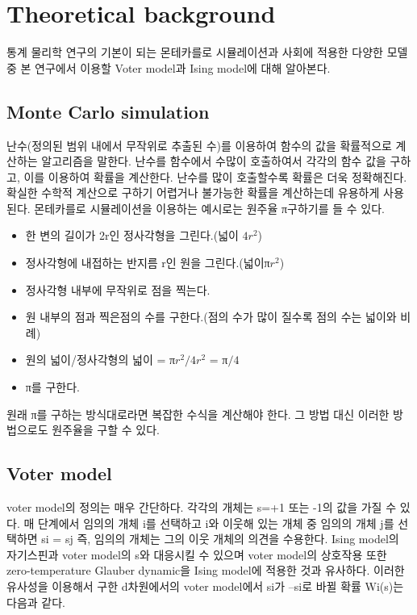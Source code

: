 \documentclass{gshs-report-v1.2}
\begin{document}
\section{Theoretical background}
통계 물리학 연구의 기본이 되는 몬테카를로 시뮬레이션과 사회에 적용한 다양한 모델 중 본 연구에서 이용할 Voter model과 Ising model에 대해 알아본다.

\subsection{Monte Carlo simulation}

난수(정의된 범위 내에서 무작위로 추출된 수)를 이용하여 함수의 값을 확률적으로 계산하는 알고리즘을 말한다. 난수를 함수에서 수많이 호출하여서 각각의 함수 값을 구하고, 이를 이용하여 확률을 계산한다. 난수를 많이 호출할수록 확률은 더욱 정확해진다. 확실한 수학적 계산으로 구하기 어렵거나 불가능한 확률을 계산하는데 유용하게 사용된다. 
몬테카를로 시뮬레이션을 이용하는 예시로는 원주율 π구하기를 들 수 있다. 

\begin{itemize}
	\item{한 변의 길이가 2r인 정사각형을 그린다.(넓이 $4r^2$)}
	\item{정사각형에 내접하는 반지름 r인 원을 그린다.(넓이π$r^2$)}
	\item{정사각형 내부에 무작위로 점을 찍는다. }
	\item{원 내부의 점과 찍은점의 수를 구한다.(점의 수가 많이 질수록 점의 수는 넓이와 비례)}
	\item{원의 넓이/정사각형의 넓이 = π$r^2/4r^2$ = π$/4$}
	\item{π를 구한다.}
\end{itemize}
원래 π를 구하는 방식대로라면 복잡한 수식을 계산해야 한다. 그 방법 대신 이러한 방법으로도 원주율을 구할 수 있다.


\subsection{Voter model}

voter model의 정의는 매우 간단하다. 각각의 개체는 s=+1 또는 -1의 값을 가질 수 있다. 매 단계에서 임의의 개체 i를 선택하고 i와 이웃해 있는 개체 중 임의의 개체 j를 선택하면 si = sj 즉, 임의의 개체는 그의 이웃 개체의 의견을 수용한다. Ising model의 자기스핀과 voter model의 s와 대응시킬 수 있으며 voter model의 상호작용 또한 zero-temperature Glauber dynamic을 Ising model에 적용한 것과 유사하다. 이러한 유사성을 이용해서 구한 \cite{Frachebourg96} d차원에서의 voter model에서 si가 –si로 바뀔 확률 Wi(s)는 다음과 같다.
\end{document}

